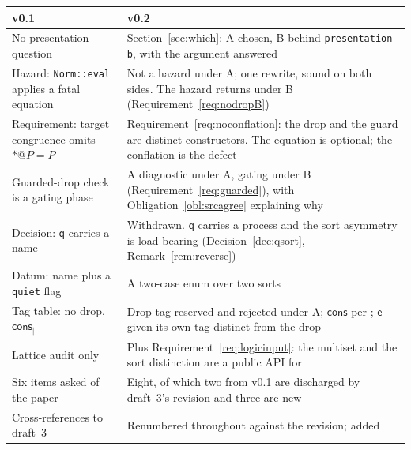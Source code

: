 \documentclass[11pt,a4paper]{article}
\makeatletter
\newcommand{\code}[1]{\texttt{#1}}
\newcommand{\quo}[1]{@#1}
\newcommand{\drp}[1]{{*}#1}
\newcommand{\ev}{\mathsf{e}}
\newcommand{\qq}{\mathsf{q}}
\newcommand{\cons}{\mathsf{cons}}
\theoremstyle{definition}
\theoremstyle{plain}
\makeatother
\begin{document}
\begin{center}
\begin{tabularx}{\linewidth}{@{}l>{\raggedright\arraybackslash}X@{}}
\toprule
v0.1 & v0.2\\
\midrule
No presentation question & Section~\ref{sec:which}: A chosen, B behind
\code{presentation-b}, with the \cite[\S4]{draft3} argument answered\\
Hazard: \code{Norm::eval} applies a fatal equation & Not a hazard under A;
one rewrite, sound on both sides. The hazard returns under B
(Requirement~\ref{req:nodropB})\\
Requirement: target congruence omits $\drp{\quo{P}} = P$ &
Requirement~\ref{req:noconflation}: the drop and the guard are distinct
constructors. The equation is optional; the conflation is the defect\\
Guarded-drop check is a gating phase & A diagnostic under A, gating under B
(Requirement~\ref{req:guarded}), with
Obligation~\ref{obl:srcagree} explaining why\\
Decision: $\qq$ carries a name & Withdrawn. $\qq$ carries a process and the
sort asymmetry is load-bearing (Decision~\ref{dec:qsort},
Remark~\ref{rem:reverse})\\
Datum: name plus a \code{quiet} flag & A two-case enum over two sorts\\
Tag table: no drop, $\cons_{\mid}$ & Drop tag reserved and rejected under A;
$\cons$ per \cite[\S3.2]{draft3}; $\ev$ given its own tag distinct from the
drop\\
Lattice audit only & Plus Requirement~\ref{req:logicinput}: the multiset and
the sort distinction are a public API for \cite{logic}\\
Six items asked of the paper & Eight, of which two from v0.1 are discharged
by draft~3's revision and three are new\\
Cross-references to draft~3 & Renumbered throughout against the revision;
\cite{logic} added\\
\bottomrule
\end{tabularx}
\end{center}
\end{document}
